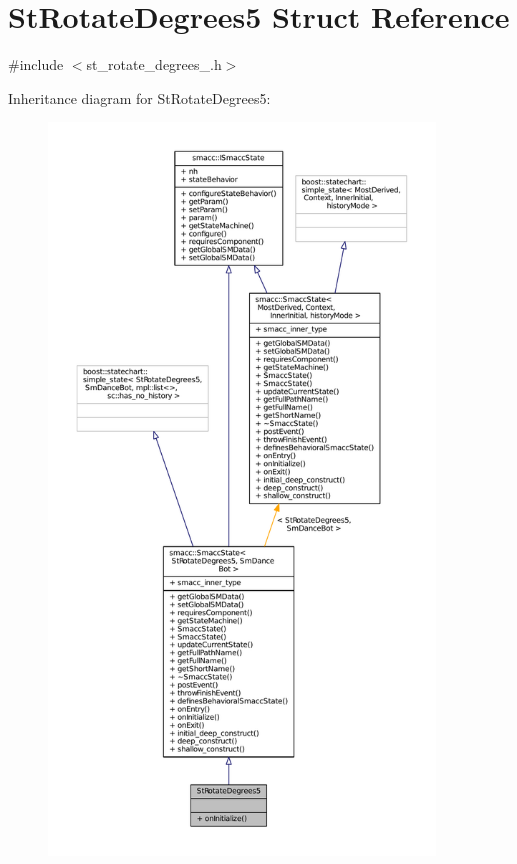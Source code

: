 \hypertarget{structStRotateDegrees5}{}\section{St\+Rotate\+Degrees5 Struct Reference}
\label{structStRotateDegrees5}


{\ttfamily \#include $<$st\+\_\+rotate\+\_\+degrees\+\_.\+h$>$}



Inheritance diagram for St\+Rotate\+Degrees5\+:
\nopagebreak
\begin{figure}[H]
\begin{center}
\leavevmode
\includegraphics[height=550pt]{structStRotateDegrees5__inherit__graph}
\end{center}
\end{figure}


